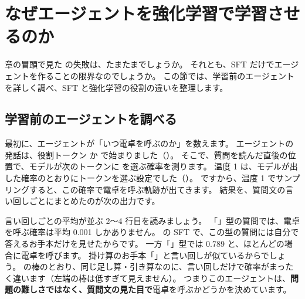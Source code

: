 \section{なぜエージェントを強化学習で学習させるのか}\label{sec:arl-why}

章の冒頭で見た  の失敗は、たまたまでしょうか。
それとも、SFT だけでエージェントを作ることの限界なのでしょうか。
この節では、学習前のエージェントを詳しく調べ、SFT と強化学習の役割の違いを整理します。

\subsection{学習前のエージェントを調べる}

最初に、エージェントが「いつ電卓を呼ぶのか」を数えます。
エージェントの発話は、役割トークン  か  で始まりました（）。
そこで、質問を読んだ直後の位置で、モデルが次のトークンに  を選ぶ確率を測ります。
温度 1 は、モデルが出した確率のとおりにトークンを選ぶ設定でした（）。
ですから、温度 1 でサンプリングすると、この確率で電卓を呼ぶ軌跡が出てきます。
結果を、質問文の言い回しごとにまとめたのが次の出力です。


言い回しごとの平均が並ぶ 2〜4 行目を読みましょう。
「」型の質問では、電卓を呼ぶ確率は平均 0.001 しかありません。
の SFT で、この型の質問には自分で答えるお手本だけを見せたからです。
一方「」型では 0.789 と、ほとんどの場合に電卓を呼びます。
掛け算のお手本「」と言い回しが似ているからでしょう。
の棒のとおり、同じ足し算・引き算なのに、言い回しだけで確率がまったく違います（左端の棒は低すぎて見えません）。
つまりこのエージェントは、\textbf{問題の難しさではなく、質問文の見た目で}電卓を呼ぶかどうかを決めています。

